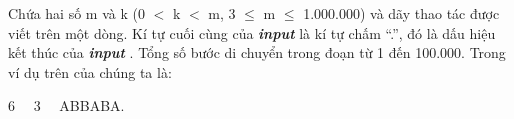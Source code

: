 Chứa hai số m và k (0 $<$ k $<$ m, 3  $\le$  m  $\le$  1.000.000) và dãy thao tác được viết trên một dòng. Kí tự cuối cùng của \textbf{\emph{ input }} là kí tự chấm “.”, đó là dấu hiệu kết thúc của \textbf{\emph{ input }} . Tổng số bước di chuyển trong đoạn từ 1 đến 100.000. Trong ví dụ trên của chúng ta là:

6   3   ABBABA.

\